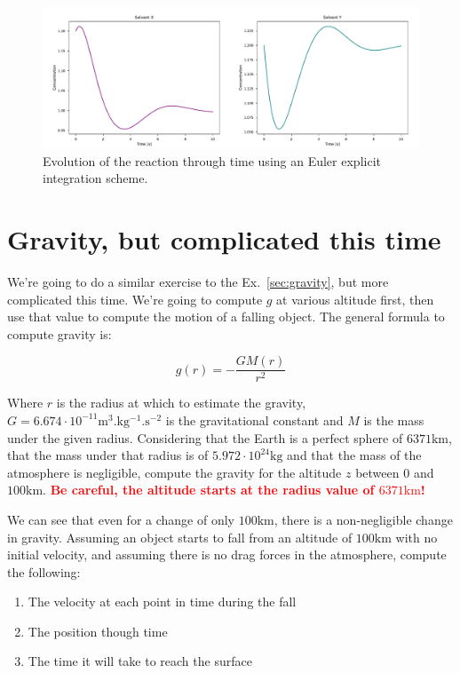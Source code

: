 \documentclass[twocolumn]{article}
\newcommand{\warning}[1]{\textcolor{red}{\bf #1}}
\begin{document}
\begin{figure}
\centering
\includegraphics[width=1.0\textwidth]{figures/chemistry.pdf}
\caption{Evolution of the reaction through time using an Euler explicit integration scheme.}
\label{fig:chemical_reaction}
\end{figure}

\section{Gravity, but complicated this time}\label{sec:gravity_complicated}

We're going to do a similar exercise to the Ex.~\ref{sec:gravity}, but more complicated this time. We're going to compute $g$ at various altitude first, then use that value to compute the motion of a falling object. The general formula to compute gravity is:

\begin{equation}
    g(r) = - \frac{GM(r)}{r^2}
\end{equation}

Where $r$ is the radius at which to estimate the gravity, $G = 6.674\cdot10^{-11}\mathrm{m^3.kg^{-1}.s^{-2}}$ is the gravitational constant and $M$ is the mass under the given radius. Considering that the Earth is a perfect sphere of $6371\mathrm{km}$, that the mass under that radius is of $5.972\cdot10^{24}\mathrm{kg}$ and that the mass of the atmosphere is negligible, compute the gravity for the altitude $z$ between $0$ and $100\mathrm{km}$. \warning{Be careful, the altitude starts at the radius value of $6371\mathrm{km}$!}

We can see that even for a change of only $100\mathrm{km}$, there is a non-negligible change in gravity. Assuming an object starts to fall from an altitude of $100\mathrm{km}$ with no initial velocity, and assuming there is no drag forces in the atmosphere, compute the following:

\begin{enumerate}
    \item The velocity at each point in time during the fall
    \item The position though time
    \item The time it will take to reach the surface
\end{enumerate}
\end{document}
